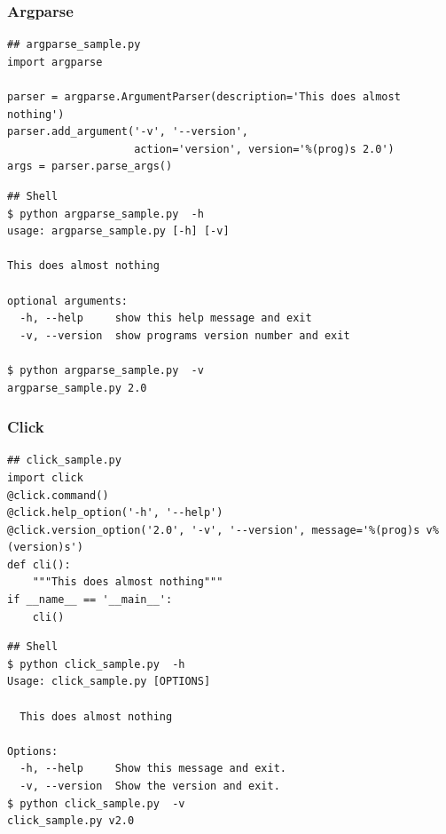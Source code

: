 \documentclass[aspectratio=169]{beamer}
\begin{document}
\begin{frame}[fragile]
\frametitle{Argparse}

{\tiny
\begin{verbatim}
## argparse_sample.py
import argparse
 
parser = argparse.ArgumentParser(description='This does almost nothing')
parser.add_argument('-v', '--version', 
                    action='version', version='%(prog)s 2.0')
args = parser.parse_args()
\end{verbatim}

\hfill

\begin{verbatim}
## Shell
$ python argparse_sample.py  -h
usage: argparse_sample.py [-h] [-v]
 
This does almost nothing
 
optional arguments:
  -h, --help     show this help message and exit
  -v, --version  show programs version number and exit
 
$ python argparse_sample.py  -v
argparse_sample.py 2.0
\end{verbatim}
}

\end{frame}


\begin{frame}[fragile]
\frametitle{Click}

{\tiny
\begin{verbatim}
## click_sample.py
import click
@click.command()
@click.help_option('-h', '--help')
@click.version_option('2.0', '-v', '--version', message='%(prog)s v%(version)s')
def cli():
    """This does almost nothing"""
if __name__ == '__main__':
    cli()
\end{verbatim}

\hfill

\begin{verbatim}
## Shell
$ python click_sample.py  -h
Usage: click_sample.py [OPTIONS]

  This does almost nothing

Options:
  -h, --help     Show this message and exit.
  -v, --version  Show the version and exit.
$ python click_sample.py  -v
click_sample.py v2.0
\end{verbatim}
}

\end{frame}
\end{document}
